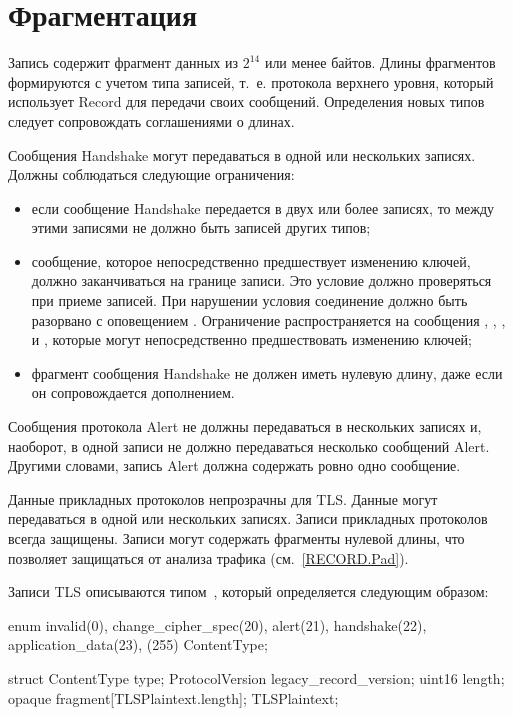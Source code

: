 \section{Фрагментация}\label{RECORD.Frag}

Запись содержит фрагмент данных из $2^{14}$ или менее байтов. Длины фрагментов
формируются с учетом типа записей, т.~е. протокола верхнего уровня, который
использует Record для передачи своих сообщений. Определения новых типов следует
сопровождать соглашениями о длинах.

Сообщения Handshake могут передаваться в одной или нескольких записях.
Должны соблюдаться следующие ограничения:
%
\begin{itemize}[label=--]
\item
если сообщение Handshake передается в двух или более записях, то между этими 
записями не должно быть записей других типов; 


\item 
сообщение, которое непосредственно предшествует изменению ключей, должно 
заканчиваться на границе записи. Это условие должно проверяться при приеме 
записей. При нарушении условия соединение должно быть разорвано с оповещением 
. Ограничение распространяется на 
сообщения , , 
,  и 
, которые могут непосредственно предшествовать 
изменению ключей;

\item 
фрагмент сообщения Handshake не должен иметь нулевую длину, 
даже если он сопровождается дополнением.
\end{itemize}

Сообщения протокола Alert не должны передаваться в нескольких записях и,
наоборот, в одной записи не должно передаваться несколько сообщений Alert.
Другими словами, запись Alert должна содержать ровно одно сообщение.

Данные прикладных протоколов непрозрачны для TLS. Данные могут передаваться 
в одной или нескольких записях. Записи прикладных протоколов всегда защищены. 
Записи могут содержать фрагменты нулевой длины, что позволяет защищаться от 
анализа трафика (см.~\ref{RECORD.Pad}).


Записи TLS описываются типом~, который определяется 
следующим образом:
\begin{codeblock}
enum {
  invalid(0),
  change_cipher_spec(20),
  alert(21),
  handshake(22),
  application_data(23),
  (255)
} ContentType;

struct {
  ContentType type;
  ProtocolVersion legacy_record_version;
  uint16 length;
  opaque fragment[TLSPlaintext.length];
} TLSPlaintext;
\end{codeblock}

